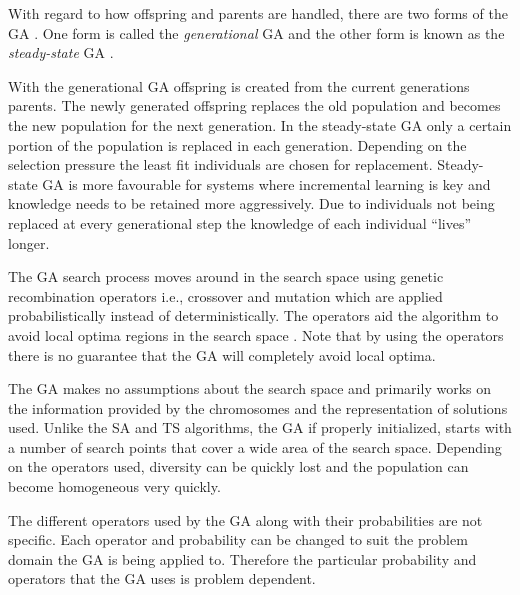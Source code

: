 With regard to how offspring and parents are handled, there are two forms of the \gls{GA} \cite{FamilyGA}. One form is called the \emph{generational} \gls{GA}  and the other form is known as the \emph{steady-state} \gls{GA} \cite{GeostatisticalGA,FamilyGA}.

With the generational \gls{GA} offspring is created from the current generations parents. The newly generated offspring replaces the old population and becomes the new population for the next generation\cite{FamilyGA, SpringerIntroToGAs, IntroToGAs}. In the steady-state \gls{GA} only a certain portion of the population is replaced in each generation. Depending on the selection pressure the least fit individuals are chosen for replacement\cite{GeostatisticalGA,FamilyGA, SpringerIntroToGAs, IntroToGAs}. Steady-state \gls{GA} is more favourable for systems where incremental learning is key and knowledge needs to be retained more aggressively\cite{SpringerIntroToGAs, IntroToGAs}. Due to individuals not being replaced at every generational step the knowledge of each individual ``lives'' longer\cite{SpringerIntroToGAs, IntroToGAs}.

The \gls{GA} search process moves around in the search space using genetic recombination operators i.e., crossover and mutation which are applied probabilistically instead of deterministically\cite{FamilyGA}. The operators aid the algorithm to avoid local optima regions in the search space \cite{HybridIntelliGA}. Note that by using the operators there is no guarantee that the \gls{GA} will completely avoid local optima\cite{CompuIntelligenceIntro}.

The \gls{GA} makes no assumptions about the search space and primarily works on the information provided by the chromosomes and the representation of solutions used\cite{CompuIntelligenceIntro,ConstrainedGA,HybridIntelliGA}. Unlike the \gls{SA} and \gls{TS} algorithms, the \gls{GA} if properly initialized, starts with a number of search points that cover a wide area of the search space. Depending on the operators used, diversity can be quickly lost and the population can become homogeneous very quickly\cite{DistributedHierarchicalGA,FamilyGA,HybridIntelliGA}\label{GASearchPoints}.
 
The different operators used by the GA along with their probabilities are not specific. Each operator and probability can be changed to suit the problem domain the GA is being applied to. Therefore the particular probability and operators that the GA uses is problem dependent.

